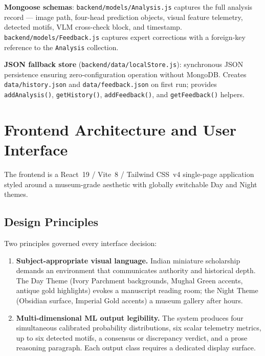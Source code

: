 \documentclass[12pt, a4paper, twoside]{article}
\begin{document}
\textbf{Mongoose schemas}: \texttt{backend/models/Analysis.js} captures the full analysis record — image path, four-head prediction objects, visual feature telemetry, detected motifs, VLM cross-check block, and timestamp. \texttt{backend/models/Feedback.js} captures expert corrections with a foreign-key reference to the \texttt{Analysis} collection.

\textbf{JSON fallback store} (\texttt{backend/data/localStore.js}): synchronous JSON persistence ensuring zero-configuration operation without MongoDB. Creates \texttt{data/history.json} and \texttt{data/feedback.json} on first run; provides \texttt{addAnalysis()}, \texttt{getHistory()}, \texttt{addFeedback()}, and \texttt{getFeedback()} helpers.

\section{Frontend Architecture and User Interface}
\label{sec:frontend}

The frontend is a React~19 / Vite~8 / Tailwind CSS~v4 single-page application styled around a museum-grade aesthetic with globally switchable Day and Night themes.

\subsection{Design Principles}

Two principles governed every interface decision:

\begin{enumerate}
  \item \textbf{Subject-appropriate visual language.} Indian miniature scholarship demands an environment that communicates authority and historical depth. The Day Theme (Ivory Parchment backgrounds, Mughal Green accents, antique gold highlights) evokes a manuscript reading room; the Night Theme (Obsidian surface, Imperial Gold accents) a museum gallery after hours.
  \item \textbf{Multi-dimensional ML output legibility.} The system produces four simultaneous calibrated probability distributions, six scalar telemetry metrics, up to six detected motifs, a consensus or discrepancy verdict, and a prose reasoning paragraph. Each output class requires a dedicated display surface.
\end{enumerate}
\end{document}

